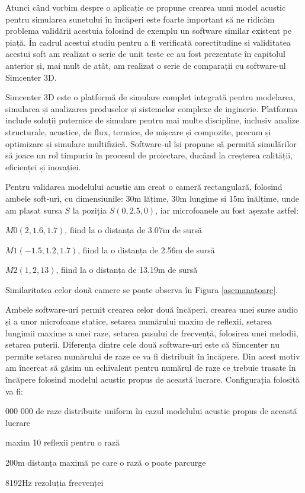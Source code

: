 Atunci când vorbim despre o aplicație ce propune crearea unui model acustic pentru simularea sunetului în încăperi este foarte important să ne ridicăm problema validării acestuia folosind de exemplu un software similar existent pe piață. În cadrul acestui studiu pentru a fi verificată corectitudine si validitatea acestui soft am realizat o serie de unit teste ce au fost prezentate în capitolul anterior și, mai mult de atât, am realizat o serie de comparații cu software-ul Simcenter 3D.

Simcenter 3D este o platformă de simulare complet integrată pentru modelarea, simularea și analizarea produselor și sistemelor complexe de inginerie. Platforma include soluții puternice de simulare pentru mai multe discipline, inclusiv analize structurale, acustice, de flux, termice, de mișcare și compozite, precum și optimizare și simulare multifizică. Software-ul își propune să permită simulărilor să joace un rol timpuriu în procesul de proiectare, ducând la creșterea calității, eficienței și inovației.

Pentru validarea modelului acustic am creat o cameră rectangulară, folosind ambele soft-uri, cu dimensiunile: 30m lățime, 30m lungime si 15m înălțime, unde am plasat sursa $S$ la poziția $S(0, 2.5,0)$, iar microfoanele au fost așezate astfel: 

\begin{itemize}
	\utb $M0(2, 1.6, 1.7)$, fiind la o distanța de 3.07m de sursă
	
	\utb $M1(-1.5, 1.2, 1.7)$, fiind la o distanța de 2.56m de sursă
	
	\utb $M2(1, 2, 13)$, fiind la o distanța de 13.19m de sursă
\end{itemize}

Similaritatea celor două camere se poate observa în Figura \ref{asemanatoare}.

Ambele software-uri permit crearea celor două încăperi, crearea unei surse audio și a unor microfoane statice, setarea numărului maxim de reflexii, setarea lungimii maxime a unei raze, setarea pasului de frecvență, folosirea unei melodii, setarea puterii. Diferența dintre cele două software-uri este că Simcenter nu permite setarea numărului de raze ce va fi distribuit în încăpere. Din acest motiv am încercat să găsim un echivalent pentru numărul de raze ce trebuie trasate în încăpere folosind modelul acustic propus de această lucrare. Configurația folosită va fi:

\begin{itemize}
	 000 000 de raze distribuite uniform în cazul modelului acustic propus de această lucrare
	
	\utb maxim 10 reflexii pentru o rază
	
	\utb 200m distanța maximă pe care o rază o poate parcurge
	
	\utb 8192Hz rezoluția frecvenței
\end{itemize}


